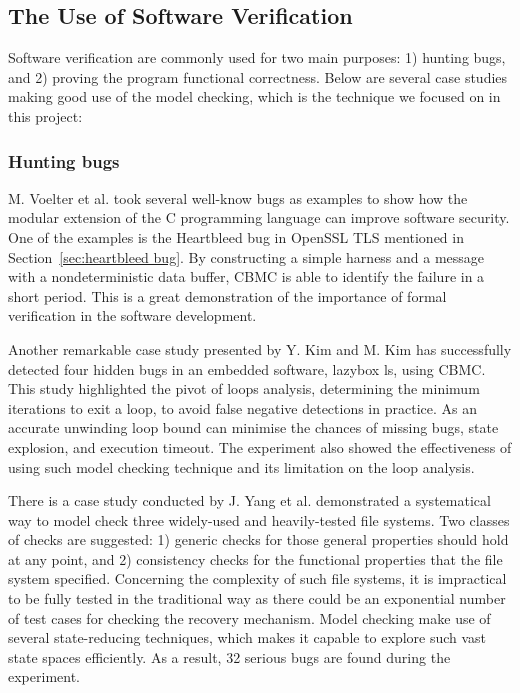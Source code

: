\subsection{The Use of Software Verification}
Software verification are commonly used for two main purposes: 1) hunting bugs, and 2) proving the program functional correctness. Below are several case studies making good use of the model checking, which is the technique we focused on in this project:

\subsubsection{Hunting bugs}
M. Voelter et al.\cite{Voelter:2015:TIS:2846696.2846698} took several well-know bugs as examples to show how the modular extension of the C programming language can improve software security. One of the examples is the Heartbleed bug in OpenSSL TLS mentioned in Section~\ref{sec:heartbleed bug}. By constructing a simple harness and a message with a nondeterministic data buffer, CBMC is able to identify the failure in a short period. This is a great demonstration of the importance of formal verification in the software development. 

Another remarkable case study presented by Y. Kim and M. Kim \cite{7091291} has successfully detected four hidden bugs in an embedded software, lazybox ls, using CBMC. This study highlighted the pivot of loops analysis, determining the minimum iterations to exit a loop, to avoid false negative detections in practice. As an accurate unwinding loop bound can minimise the chances of missing bugs, state explosion, and execution timeout. The experiment also showed the effectiveness of using such model checking technique and its limitation on the loop analysis. 

There is a case study conducted by J. Yang et al. \cite{Yang:2006:UMC:1189256.1189259} demonstrated a systematical way to model check three widely-used and heavily-tested file systems. Two classes of checks are suggested: 1) generic checks for those general properties should hold at any point, and 2) consistency checks for the functional properties that the file system specified. Concerning the complexity of such file systems, it is impractical to be fully tested in the traditional way as there could be an exponential number of test cases for checking the recovery mechanism. Model checking make use of several state-reducing techniques, which makes it capable to explore such vast state spaces efficiently. As a result, 32 serious bugs are found during the experiment.

